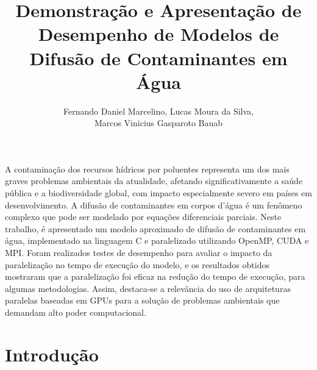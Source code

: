 \documentclass[12pt]{article}
\title{Demonstração e Apresentação de Desempenho de Modelos de Difusão de Contaminantes em Água}
\author{Fernando Daniel Marcelino\inst{1}, Lucas Moura da Silva\inst{1},\\ Marcos Vinicius Gasparoto Bauab\inst{1} }
\begin{document}
 

\maketitle

     
\begin{resumo} 
A contaminação dos recursos hídricos por poluentes representa um dos mais graves problemas ambientais da atualidade, afetando significativamente a saúde pública e a biodiversidade global, com impacto especialmente severo em países em desenvolvimento. A difusão de contaminantes em corpos d'água é um fenômeno complexo que pode ser modelado por equações diferenciais parciais. Neste trabalho, é apresentado um modelo aproximado de difusão de contaminantes em água, implementado na linguagem C e paralelizado utilizando OpenMP, CUDA e MPI. Foram realizados testes de desempenho para avaliar o impacto da paralelização no tempo de execução do modelo, e os resultados obtidos mostraram que a paralelização foi eficaz na redução do tempo de execução, para algumas metodologias. Assim, destaca-se a relevância do uso de arquiteturas paralelas baseadas em GPUs para a solução de problemas ambientais que demandam alto poder computacional.
\end{resumo}

\section{Introdução} \label{sec:introducao}
\end{document}
